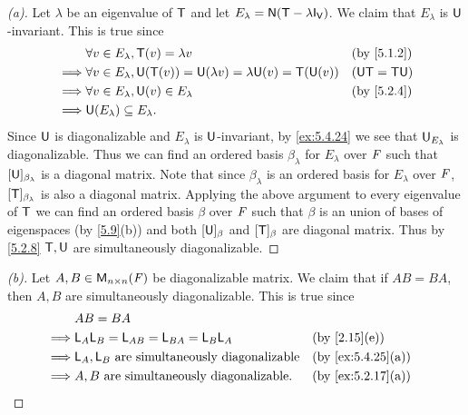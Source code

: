 \begin{proof}[(a)]
	Let \(\lambda\) be an eigenvalue of \(\mathsf{T}\) and let \(E_{\lambda} = \ns{\T - \lambda \IT[\V]}\).
	We claim that \(E_{\lambda}\) is \(\mathsf{U}\)-invariant.
	This is true since
	\begin{align*}
		         & \forall v \in E_{\lambda}, \T(v) = \lambda v                                     &  & \by{5.1.2}      \\
		\implies & \forall v \in E_{\lambda}, \U(\T(v)) = \U(\lambda v) = \lambda \U(v) = \T(\U(v)) &  & (\U \T = \T \U) \\
		\implies & \forall v \in E_{\lambda}, \U(v) \in E_{\lambda}                                 &  & \by{5.2.4}      \\
		\implies & \U(E_{\lambda}) \subseteq E_{\lambda}.
	\end{align*}
	Since \(\mathsf{U}\) is diagonalizable and \(E_{\lambda}\) is \(\mathsf{U}\)-invariant, by \cref{ex:5.4.24} we see that \(\mathsf{U}_{E_{\lambda}}\) is diagonalizable.
	Thus we can find an ordered basis \(\beta_{\lambda}\) for \(E_{\lambda}\) over \(\mathit{F}\) such that \([\mathsf{U}]_{\beta_{\lambda}}\) is a diagonal matrix.
	Note that since \(\beta_{\lambda}\) is an ordered basis for \(E_{\lambda}\) over \(\mathit{F}\), \([\mathsf{T}]_{\beta_{\lambda}}\) is also a diagonal matrix.
	Applying the above argument to every eigenvalue of \(\mathsf{T}\) we can find an ordered basis \(\beta\) over \(\mathit{F}\) such that \(\beta\) is an union of bases of eigenspaces (by \cref{5.9}(b)) and both \([\mathsf{U}]_{\beta}\) and \([\mathsf{T}]_{\beta}\) are diagonal matrix.
	Thus by \cref{5.2.8} \(\mathsf{T}, \mathsf{U}\) are simultaneously diagonalizable.
\end{proof}

\begin{proof}[(b)]
	Let \(A, B \in \mathsf{M}_{{n} \times n}({\mathit{F}})\) be diagonalizable matrix.
	We claim that if \(AB = BA\), then \(A, B\) are simultaneously diagonalizable.
	This is true since
	\begin{align*}
		         & AB = BA                                                                     \\
		\implies & \L_A \L_B = \L_{AB} = \L_{BA} = \L_B \L_A            &  & \by{2.15}[e]      \\
		\implies & \L_A, \L_B \text{ are simultaneously diagonalizable} &  & \by{ex:5.4.25}[a] \\
		\implies & A, B \text{ are simultaneously diagonalizable}.      &  & \by{ex:5.2.17}[a]
	\end{align*}
\end{proof}


